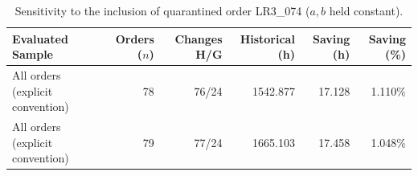 \begin{table}[!htbp]
\centering
\caption{Sensitivity to the inclusion of quarantined order LR3\_074 ($a, b$ held constant).}
\label{tab:sensitivity_sample_cohort}
\renewcommand{\arraystretch}{1.15}
\small
\begin{tabularx}{\textwidth}{Xrrrrr}
\toprule
\textbf{Evaluated Sample} & \textbf{Orders ($n$)} & \textbf{Changes H/G} & \textbf{Historical (h)} & \textbf{Saving (h)} & \textbf{Saving (\%)} \\
\midrule
All orders (explicit convention) & 78 & 76/24 & 1542.877 & 17.128 & 1.110\% \\
All orders (explicit convention) & 79 & 77/24 & 1665.103 & 17.458 & 1.048\% \\
\bottomrule
\end{tabularx}
\end{table}
